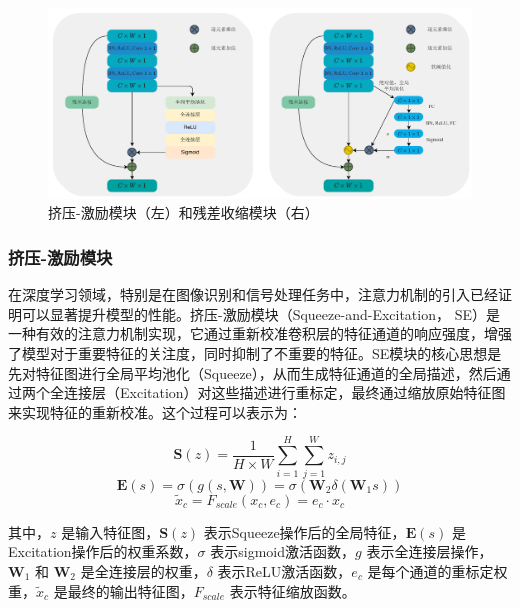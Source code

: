 \begin{figure}
    \centering
    \includegraphics[width=\textwidth]{Image/se_rsb_cn.pdf}
    \caption{挤压-激励模块（左）和残差收缩模块（右）}
    \label{fig:se_rsb}
\end{figure}

\subsubsection{挤压-激励模块}\label{sec:background}
在深度学习领域，特别是在图像识别和信号处理任务中，注意力机制的引入已经证明可以显著提升模型的性能。挤压-激励模块（Squeeze-and-Excitation， SE）是一种有效的注意力机制实现，它通过重新校准卷积层的特征通道的响应强度，增强了模型对于重要特征的关注度，同时抑制了不重要的特征。SE模块的核心思想是先对特征图进行全局平均池化（Squeeze），从而生成特征通道的全局描述，然后通过两个全连接层（Excitation）对这些描述进行重标定，最终通过缩放原始特征图来实现特征的重新校准。这个过程可以表示为：

\begin{equation}
    \textbf{S}(z) = \frac{1}{H \times W} \sum_{i=1}^{H} \sum_{j=1}^{W} z_{i,j}
\end{equation}
\begin{equation}
    \textbf{E}(s) = \sigma(g(s, \textbf{W})) = \sigma(\textbf{W}_2 \delta(\textbf{W}_1 s))
\end{equation}
\begin{equation}
    \tilde{x}_c = F_{scale}(x_c, e_c) = e_c \cdot x_c
\end{equation}

其中，\(z\) 是输入特征图，\(\textbf{S}(z)\) 表示Squeeze操作后的全局特征，\(\textbf{E}(s)\) 是Excitation操作后的权重系数，\(\sigma\) 表示sigmoid激活函数，\(g\) 表示全连接层操作，\(\textbf{W}_1\) 和 \(\textbf{W}_2\) 是全连接层的权重，\(\delta\) 表示ReLU激活函数，\(e_c\) 是每个通道的重标定权重，\(\tilde{x}_c\) 是最终的输出特征图，\(F_{scale}\) 表示特征缩放函数。


